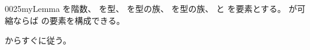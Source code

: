 \documentclass[index]{subfiles}
\begin{document}
\begin{myBlock}{0025}{myLemma}
  を階数、
  を型、
  を型の族、
  を型の族、
  と
  を要素とする。
  が可縮ならば
  の要素を構成できる。
\end{myBlock}
\begin{myProof}
  からすぐに従う。
\end{myProof}
\end{document}
